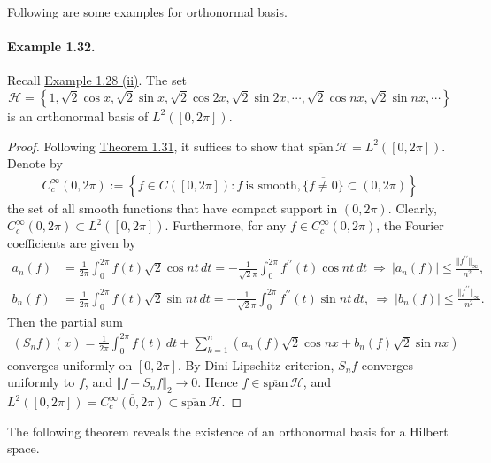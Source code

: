 \documentclass{article}
\begin{document}
Following are some examples for orthonormal basis.

\paragraph{Example 1.32.\label{example:1.32}} Recall \hyperref[example:1.28]{Example 1.28 (ii)}. The set $$\mathscr{H}=\left\{1,\sqrt{2}\cos x,\sqrt{2}\sin x,\sqrt{2}\cos 2x,\sqrt{2}\sin 2x,\cdots,\sqrt{2}\cos nx,\sqrt{2}\sin nx,\cdots\right\}$$ is an orthonormal basis of $L^2([0,2\pi])$.
\begin{proof}
Following \hyperref[thm:1.31]{Theorem 1.31}, it suffices to show that $\overline{\mathrm{span}}\,\mathscr{H} = L^2([0,2\pi])$. Denote by
\begin{align*}
	C_c^\infty(0,2\pi):= \left\{f\in C([0,2\pi]):f\ \text{is smooth},\overline{\{f\neq 0\}}\subset(0,2\pi)\right\}
\end{align*}
the set of all smooth functions that have compact support in $(0,2\pi)$. Clearly, $C_c^\infty(0,2\pi)\subset L^2([0,2\pi])$. Furthermore, for any $f\in C_c^\infty(0,2\pi)$, the Fourier coefficients are given by
\begin{align*}
	a_n(f) &= \frac{1}{2\pi}\int_0^{2\pi} f(t)\sqrt{2}\cos nt\,dt = -\frac{1}{\sqrt{2}\pi}\int_0^{2\pi} f^{\prime\prime}(t)\cos nt\,dt\ \Rightarrow\ \vert a_n(f)\vert\leq\frac{\Vert f^{\prime\prime}\Vert_\infty}{n^2},\\
	b_n(f) &= \frac{1}{2\pi}\int_0^{2\pi} f(t)\sqrt{2}\sin nt\,dt = -\frac{1}{\sqrt{2}\pi}\int_0^{2\pi} f^{\prime\prime}(t)\sin nt\,dt,\ \Rightarrow\ \vert b_n(f)\vert\leq\frac{\Vert f^{\prime\prime}\Vert_\infty}{n^2}.
\end{align*}
Then the partial sum
\begin{align*}
	(S_nf)(x) = \frac{1}{2\pi}\int_0^{2\pi}f(t)\,dt + \sum_{k=1}^n\left(a_n(f)\sqrt{2}\cos nx + b_n(f)\sqrt{2}\sin nx\right)
\end{align*}
converges uniformly on $[0,2\pi]$. By Dini-Lipschitz criterion, $S_nf$ converges uniformly to $f$, and $\Vert f-S_nf\Vert_2\to 0$. Hence $f\in\overline{\mathrm{span}}\,\mathscr{H}$, and $L^2([0,2\pi]) = \overline{C_c^\infty(0,2\pi)} \subset\overline{\mathrm{span}}\,\mathscr{H}$.
\end{proof}

The following theorem reveals the existence of an orthonormal basis for a Hilbert space.
\end{document}
